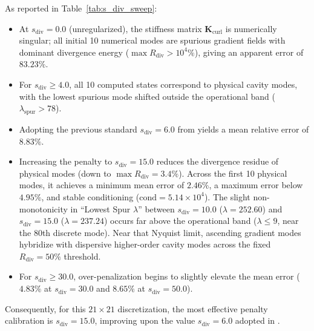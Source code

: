 \documentclass[VANCOUVER,Times1COL]{WileyNJD-v5}
\begin{document}
As reported in Table~\ref{tab:s_div_sweep}:
\begin{itemize}
    \item At $s_{\mathrm{div}} = 0.0$ (unregularized), the stiffness matrix $\mathbf{K}_{\mathrm{curl}}$ is numerically singular; all initial 10 numerical modes are spurious gradient fields with dominant divergence energy ($\max R_{\mathrm{div}} > 10^4\%$), giving an apparent error of $83.23\%$.
    \item For $s_{\mathrm{div}} \ge 4.0$, all 10 computed states correspond to physical cavity modes, with the lowest spurious mode shifted outside the operational band ($\lambda_{\mathrm{spur}} > 78$).
    \item Adopting the previous standard $s_{\mathrm{div}} = 6.0$ from \cite{stable_vnmm2d_2026} yields a mean relative error of $8.83\%$.
    \item Increasing the penalty to $s_{\mathrm{div}} = 15.0$ reduces the divergence residue of physical modes (down to $\max R_{\mathrm{div}} = 3.4\%$). Across the first 10 physical modes, it achieves a minimum mean error of $\mathbf{2.46\%}$, a maximum error below $4.95\%$, and stable conditioning ($\mathrm{cond} = 5.14 \times 10^4$). The slight non-monotonicity in ``Lowest Spur $\lambda$'' between $s_{\mathrm{div}} = 10.0$ ($\lambda = 252.60$) and $s_{\mathrm{div}} = 15.0$ ($\lambda = 237.24$) occurs far above the operational band ($\lambda \le 9$, near the 80th discrete mode). Near that Nyquist limit, ascending gradient modes hybridize with dispersive higher-order cavity modes across the fixed $R_{\mathrm{div}} = 50\%$ threshold.
    \item For $s_{\mathrm{div}} \ge 30.0$, over-penalization begins to slightly elevate the mean error ($4.83\%$ at $s_{\mathrm{div}} = 30.0$ and $8.65\%$ at $s_{\mathrm{div}} = 50.0$).
\end{itemize}
Consequently, for this $21 \times 21$ discretization, the most effective penalty calibration is $s_{\mathrm{div}} = 15.0$, improving upon the value $s_{\mathrm{div}} = 6.0$ adopted in \cite{stable_vnmm2d_2026}.
\end{document}
